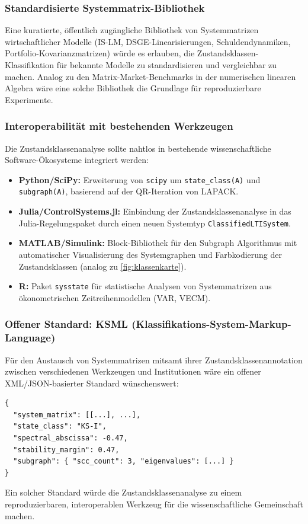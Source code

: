 \documentclass[a4paper, 12pt, twoside, openright]{report}
\theoremstyle{definition}
\theoremstyle{definition}
\begin{document}
\subsubsection*{Standardisierte Systemmatrix-Bibliothek}

Eine kuratierte, öffentlich zugängliche Bibliothek von Systemmatrizen
wirtschaftlicher Modelle (IS-LM, DSGE-Linearisierungen, Schuldendynamiken,
Portfolio-Kovarianzmatrizen) würde es erlauben, die Zustandsklassen-Klassifikation
für bekannte Modelle zu standardisieren und vergleichbar zu machen.
Analog zu den Matrix-Market-Benchmarks in der numerischen linearen Algebra
wäre eine solche Bibliothek die Grundlage für reproduzierbare Experimente.

\subsubsection*{Interoperabilität mit bestehenden Werkzeugen}

Die Zustands\-klassen\-analyse sollte nahtlos in bestehende wissenschaftliche
Software-Öko\-systeme integriert werden:
\begin{itemize}
  \item \textbf{Python/SciPy:} Erweiterung von \texttt{scipy} um
    \texttt{state\_class(A)} und \texttt{subgraph(A)},
    basierend auf der QR-Iteration von LAPACK.
  \item \textbf{Julia/ControlSystems.jl:} Einbindung der Zustandsklassenanalyse
    in das Julia-Regelungspaket durch einen neuen Systemtyp \texttt{ClassifiedLTISystem}.
  \item \textbf{MATLAB/Simulink:} Block-Bibliothek für den Subgraph Algorithmus
    mit automatischer Visualisierung des Systemgraphen und Farbkodierung
    der Zustandsklassen (analog zu \cref{fig:klassenkarte}).
  \item \textbf{R:} Paket \texttt{sysstate} für statistische Analysen von
    Systemmatrizen aus ökonometrischen Zeitreihenmodellen (VAR, VECM).
\end{itemize}

\subsubsection*{Offener Standard: KSML (Klassifikations-System-Markup-Language)}

Für den Austausch von Systemmatrizen mitsamt ihrer Zustandsklassenannotation
zwischen verschiedenen Werkzeugen und Institutionen wäre ein offener
XML/JSON-basierter Standard wünschenswert:
\begin{verbatim}
{
  "system_matrix": [[...], ...],
  "state_class": "KS-I",
  "spectral_abscissa": -0.47,
  "stability_margin": 0.47,
  "subgraph": { "scc_count": 3, "eigenvalues": [...] }
}
\end{verbatim}
Ein solcher Standard würde die Zustandsklassenanalyse zu einem reproduzierbaren,
interoperablen Werkzeug für die wissenschaftliche Gemeinschaft machen.
\end{document}
